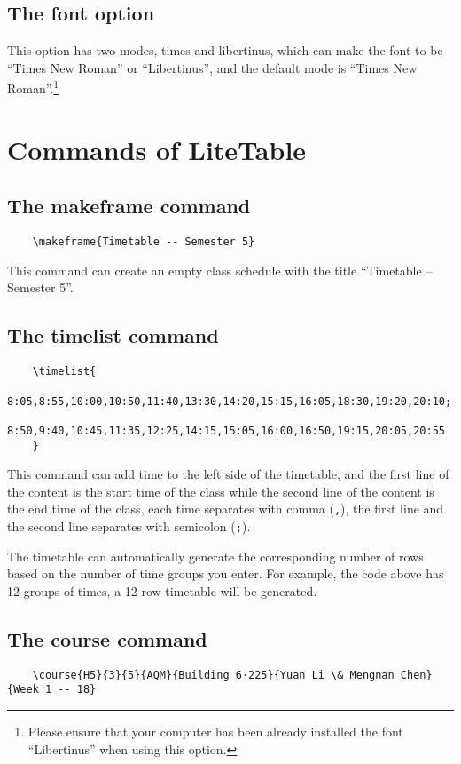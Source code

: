 \documentclass[11pt]{article}
\def\pkg#1{\texorpdfstring{\textcolor{pkgcolor}{\textsf{#1}}}{“#1”}}
\def\mode#1{\texorpdfstring{\textcolor{moducolor}{\textsf{#1}}}{“#1”}}
\def\cmd#1{\texorpdfstring{\textcolor{cmdcolor}{\textsf{#1}}}{“#1”}}
\begin{document}
\subsection{The \mode{font} option}
This option has two modes, \mode{times} and \mode{libertinus}, which can make the font to be ``Times New Roman'' or ``Libertinus'', and the default mode is ``Times New Roman''.\footnote{Please ensure that your computer has been already installed the font ``Libertinus'' when using this option.}

\section{Commands of \pkg{LiteTable}}

\subsection{The \cmd{makeframe} command}
\begin{verbatim}
    \makeframe{Timetable -- Semester 5}
\end{verbatim}

This command can create an empty class schedule with the title ``Timetable -- Semester 5''.

\subsection{The \cmd{timelist} command}
\begin{verbatim}
    \timelist{
      8:05,8:55,10:00,10:50,11:40,13:30,14:20,15:15,16:05,18:30,19:20,20:10;
      8:50,9:40,10:45,11:35,12:25,14:15,15:05,16:00,16:50,19:15,20:05,20:55
    }
\end{verbatim}

This command can add time to the left side of the timetable, and the first line of the content is the start time of the class while the second line of the content is the end time of the class, each time separates with comma (\verb|,|), the first line and the second line separates with semicolon (\verb|;|).

The timetable can automatically generate the corresponding number of rows based on the number of time groups you enter. For example, the code above has 12 groups of times, a 12-row timetable will be generated.

\subsection{The \cmd{course} command}
\begin{verbatim}
    \course{H5}{3}{5}{AQM}{Building 6·225}{Yuan Li \& Mengnan Chen}{Week 1 -- 18}
\end{verbatim}
\end{document}
